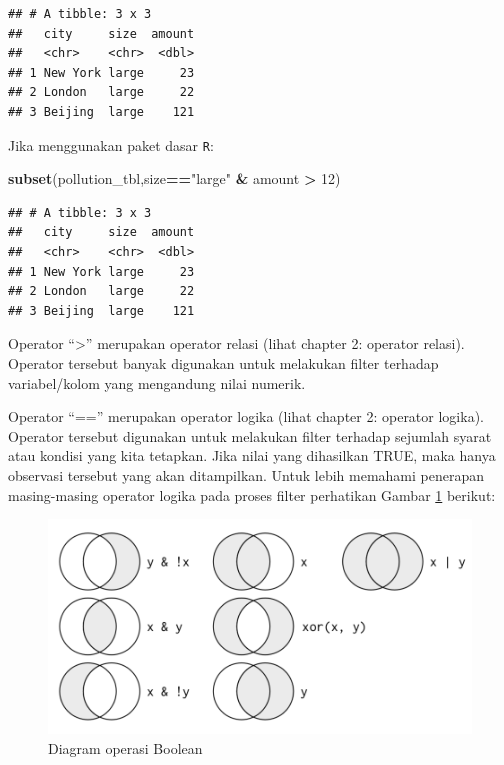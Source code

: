 \documentclass[]{book}
\newenvironment{Shaded}{\begin{snugshade}}{\end{snugshade}}
\newcommand{\KeywordTok}[1]{\textcolor[rgb]{0.13,0.29,0.53}{\textbf{#1}}}
\newcommand{\DecValTok}[1]{\textcolor[rgb]{0.00,0.00,0.81}{#1}}
\newcommand{\StringTok}[1]{\textcolor[rgb]{0.31,0.60,0.02}{#1}}
\newcommand{\OperatorTok}[1]{\textcolor[rgb]{0.81,0.36,0.00}{\textbf{#1}}}
\newcommand{\NormalTok}[1]{#1}
\begin{document}
\begin{verbatim}
## # A tibble: 3 x 3
##   city     size  amount
##   <chr>    <chr>  <dbl>
## 1 New York large     23
## 2 London   large     22
## 3 Beijing  large    121
\end{verbatim}

Jika menggunakan paket dasar \texttt{R}:

\begin{Shaded}
\begin{Highlighting}[]
\KeywordTok{subset}\NormalTok{(pollution_tbl,size}\OperatorTok{==}\StringTok{"large"} \OperatorTok{&}\StringTok{ }\NormalTok{amount }\OperatorTok{>}\StringTok{ }\DecValTok{12}\NormalTok{)}
\end{Highlighting}
\end{Shaded}

\begin{verbatim}
## # A tibble: 3 x 3
##   city     size  amount
##   <chr>    <chr>  <dbl>
## 1 New York large     23
## 2 London   large     22
## 3 Beijing  large    121
\end{verbatim}

Operator ``\textgreater{}'' merupakan operator relasi (lihat chapter 2:
operator relasi). Operator tersebut banyak digunakan untuk melakukan
filter terhadap variabel/kolom yang mengandung nilai numerik.

Operator ``=='' merupakan operator logika (lihat chapter 2: operator
logika). Operator tersebut digunakan untuk melakukan filter terhadap
sejumlah syarat atau kondisi yang kita tetapkan. Jika nilai yang
dihasilkan TRUE, maka hanya observasi tersebut yang akan ditampilkan.
Untuk lebih memahami penerapan masing-masing operator logika pada proses
filter perhatikan Gambar \ref{fig:filter} berikut:

\begin{figure}

{\centering \includegraphics[width=6.57in]{filter} 

}

\caption{Diagram operasi Boolean}\label{fig:filter}
\end{figure}
\end{document}
